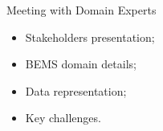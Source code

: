 \begin{tframe}{Meeting with Domain Experts}
\begin{itemize}
    \item Stakeholders presentation;
    \item BEMS domain details;
    \item Data representation;
    \item Key challenges.
\end{itemize}
\end{tframe}